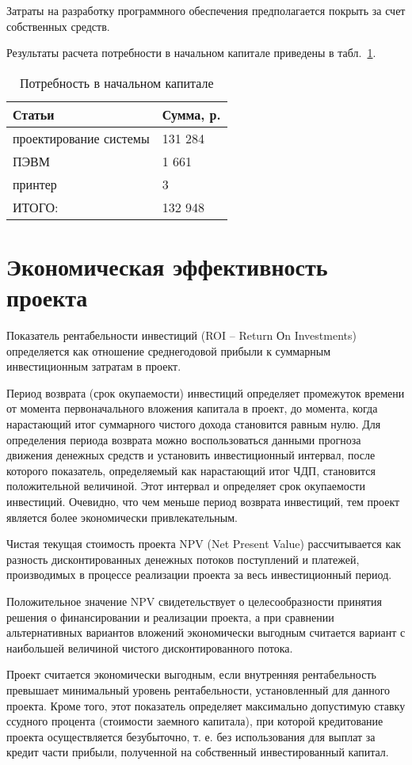 Затраты на разработку программного обеспечения предполагается покрыть за счет собственных средств.

Результаты расчета потребности в начальном капитале приведены в табл.~\ref{tab:all}.

\begin{table}[ht]
\caption{Потребность в начальном капитале}
\begin{tabular}{|p{7cm}|p{7cm}|}
\hline
Статьи&Сумма, р.\\
\hline
проектирование системы&131 284\\
ПЭВМ&1 661\\
принтер&3\\
\hline
ИТОГО:&132 948\\
\hline
\end{tabular}
\label{tab:all}
\end{table}

\section{Экономическая эффективность проекта}

Показатель рентабельности инвестиций (ROI – Return Оn Investments) определяется как отношение среднегодовой
прибыли к суммарным инвестиционным затратам в проект.

Период возврата (срок окупаемости) инвестиций определяет промежуток времени от момента первоначального
вложения капитала в проект, до момента, когда нарастающий итог суммарного чистого дохода становится равным нулю.
Для определения периода возврата можно воспользоваться данными прогноза движения денежных средств и установить
инвестиционный интервал, после которого показатель, определяемый как нарастающий итог ЧДП,
становится положительной величиной. Этот интервал и определяет срок окупаемости инвестиций. Очевидно, что чем
меньше период возврата инвестиций, тем проект является более экономически привлекательным.

Чистая текущая стоимость проекта NPV (Net Present Value) рассчитывается как разность дисконтированных денежных
потоков поступлений и платежей, производимых в процессе реализации проекта за весь инвестиционный период.

Положительное значение NPV свидетельствует о целесообразности принятия решения о финансировании и реализации
проекта, а при сравнении альтернативных вариантов вложений экономически выгодным считается вариант с
наибольшей величиной чистого дисконтированного потока.

Проект считается экономически выгодным, если внутренняя рентабельность превышает минимальный уровень
рентабельности, установленный для данного проекта. Кроме того, этот показатель определяет максимально
допустимую ставку ссудного процента (стоимости заемного капитала), при которой кредитование проекта
осуществляется безубыточно, т. е. без использования для выплат за кредит части прибыли, полученной
на собственный инвестированный капитал.

